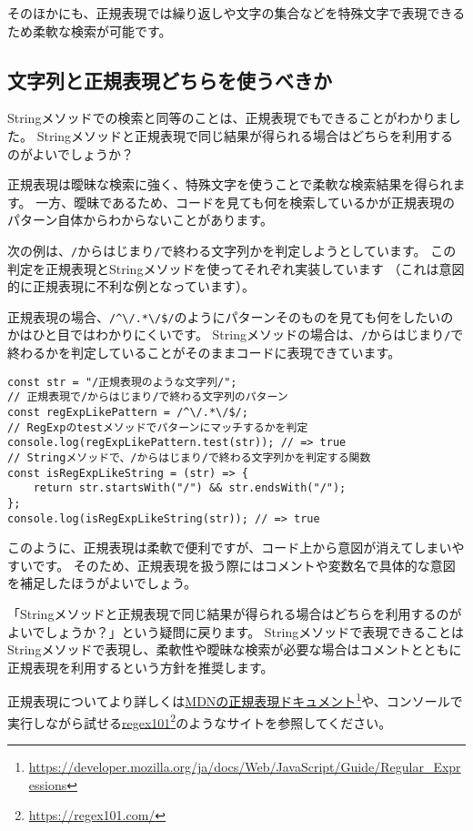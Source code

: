そのほかにも、正規表現では繰り返しや文字の集合などを特殊文字で表現できるため柔軟な検索が可能です。

\hypertarget{string-or-regexp}{%
\subsection{文字列と正規表現どちらを使うべきか}\label{string-or-regexp}}

Stringメソッドでの検索と同等のことは、正規表現でもできることがわかりました。
Stringメソッドと正規表現で同じ結果が得られる場合はどちらを利用するのがよいでしょうか？

正規表現は曖昧な検索に強く、特殊文字を使うことで柔軟な検索結果を得られます。
一方、曖昧であるため、コードを見ても何を検索しているかが正規表現のパターン自体からわからないことがあります。

次の例は、\texttt{/}からはじまり\texttt{/}で終わる文字列かを判定しようとしています。
この判定を正規表現とStringメソッドを使ってそれぞれ実装しています
（これは意図的に正規表現に不利な例となっています）。

\enlargethispage{\baselineskip}正規表現の場合、\texttt{/\^{}\textbackslash/.*\textbackslash/\$/}のようにパターンそのものを見ても何をしたいのかはひと目ではわかりにくいです。
Stringメソッドの場合は、\texttt{/}からはじまり\texttt{/}で終わるかを判定していることがそのままコードに表現できています。

\begin{lstlisting}
const str = "/正規表現のような文字列/";
// 正規表現で/からはじまり/で終わる文字列のパターン
const regExpLikePattern = /^\/.*\/$/;
// RegExpのtestメソッドでパターンにマッチするかを判定
console.log(regExpLikePattern.test(str)); // => true
// Stringメソッドで、/からはじまり/で終わる文字列かを判定する関数
const isRegExpLikeString = (str) => {
    return str.startsWith("/") && str.endsWith("/");
};
console.log(isRegExpLikeString(str)); // => true
\end{lstlisting}

このように、正規表現は柔軟で便利ですが、コード上から意図が消えてしまいやすいです。
そのため、正規表現を扱う際にはコメントや変数名で具体的な意図を補足したほうがよいでしょう。

「Stringメソッドと正規表現で同じ結果が得られる場合はどちらを利用するのがよいでしょうか？」という疑問に戻ります。
Stringメソッドで表現できることはStringメソッドで表現し、柔軟性や曖昧な検索が必要な場合はコメントとともに正規表現を利用するという方針を推奨します。

正規表現についてより詳しくは\href{https://developer.mozilla.org/ja/docs/Web/JavaScript/Guide/Regular_Expressions}{MDNの正規表現ドキュメント}\footnote{\url{https://developer.mozilla.org/ja/docs/Web/JavaScript/Guide/Regular_Expressions}}や、コンソールで実行しながら試せる\href{https://regex101.com/}{regex101}\footnote{\url{https://regex101.com/}}のようなサイトを参照してください。

